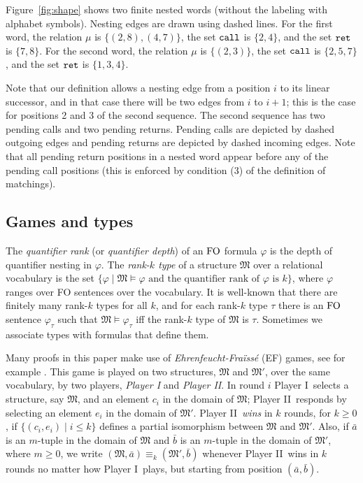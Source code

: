 \documentclass{LMCS}
\newcommand{\dupl}{Player II}
\newcommand{\spoiler}{Player I}
\newcommand{\M}{{\mu}}
\newcommand{\MM}{\mathfrak{M}}
\newcommand{\FO}{{\rm FO}}
\renewcommand{\phi}{\varphi}
\theoremstyle{plain}
\theoremstyle{definition}
\newcommand{\retr}{\mathit{ret}}
\newcommand{\rett}{{\tt ret}}
\newcommand{\call}{{\tt call}}
\renewcommand{\retr}{\rett}
\newcounter{example}
\begin{document}
Figure~\ref{fig:shape} shows two finite nested words (without the
labeling with alphabet symbols).  Nesting edges are drawn using dashed
lines.  For the first word, the relation $\M$ is $\{(2,8), (4,7)\}$,
the set $\call$ is $\{2,4\}$, and the set $\retr$ is $\{7,8\}$.
For the second word, the
relation $\M$ is $\{(2,3)\}$, the set $\call$ is $\{2,5,7\}$, and the
set $\retr$ is $\{1,3,4\}$.

Note that our definition allows a nesting edge from a position $i$ to
its linear successor, and in that case there will be two edges from
$i$ to $i+1$; this is the case for positions 2 and 3 of the second
sequence.  The second sequence has two pending calls and two pending
returns.  Pending calls are depicted by dashed outgoing edges and
pending returns are depicted by dashed incoming edges.  Note that
all pending return positions in a nested word appear before any of the
pending call positions (this is enforced by condition (3) of the
definition of matchings).

\subsection{Games and types}


The {\em quantifier rank} (or {\em quantifier depth}) of
an $\FO$ formula $\phi$ is the depth of quantifier nesting in $\phi$.
The  {\em rank-$k$ type} of a structure $\MM$ over a relational vocabulary
is the set $\{\phi\mid \MM\models\phi \text{ and
 the quantifier rank of $\phi$ is $k$}\}$, 
where $\phi$ ranges over FO sentences over the vocabulary.
It is well-known that there are finitely many rank-$k$ types for all
$k$, and  
for each rank-$k$ type $\tau$ there is an $\FO$ sentence 
$\phi_\tau$ such that $\MM\models\phi_\tau$ iff
the rank-$k$ type of $\MM$ is $\tau$. 
Sometimes we 
associate types with formulas that define them.

Many proofs in this paper make use of {\em Ehrenfeucht-Fra\"iss\'e}
(EF) games, see for example \cite{I}. This game is played on two structures, $\MM$ and $\MM'$,
over the same vocabulary, by two players, {\em \spoiler} and {\em
\dupl}.  In round $i$ \spoiler\ selects a structure, say $\MM$, and an
element $c_i$ in the domain of $\MM$; \dupl\ responds by selecting an
element $e_i$ in the domain of $\MM'$.  \dupl\ {\em wins} in $k$
rounds, for $k \geq 0$, if $\{(c_i,e_i) \mid i \leq k\}$ defines a
partial isomorphism between $\MM$ and $\MM'$.  Also, if $\bar a$ is an
$m$-tuple in the domain of $\MM$ and $\bar b$ is an $m$-tuple in the
domain of $\MM'$, where $m \geq 0$, we write $(\MM,\bar a) \equiv_k
(\MM',\bar b)$ whenever \dupl\ wins in $k$ rounds no matter how
\spoiler\ plays, but starting from position $(\bar a,\bar b)$.
\end{document}
